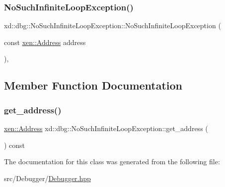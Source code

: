 \subsubsection{\texorpdfstring{No\+Such\+Infinite\+Loop\+Exception()}{NoSuchInfiniteLoopException()}}
{\footnotesize\ttfamily xd\+::dbg\+::\+No\+Such\+Infinite\+Loop\+Exception\+::\+No\+Such\+Infinite\+Loop\+Exception (\begin{DoxyParamCaption}\item[{const \mbox{\hyperlink{namespacexd_1_1xen_a94a8d6c9448e8330c771c100dba152c3}{xen\+::\+Address}}}]{address }\end{DoxyParamCaption})\hspace{0.3cm}{\ttfamily [inline]}, {\ttfamily [explicit]}}



\subsection{Member Function Documentation}
\mbox{\label{classxd_1_1dbg_1_1_no_such_infinite_loop_exception_a83b0d3f3fec215a59b8ecc9e70996505}} 
\subsubsection{\texorpdfstring{get\+\_\+address()}{get\_address()}}
{\footnotesize\ttfamily \mbox{\hyperlink{namespacexd_1_1xen_a94a8d6c9448e8330c771c100dba152c3}{xen\+::\+Address}} xd\+::dbg\+::\+No\+Such\+Infinite\+Loop\+Exception\+::get\+\_\+address (\begin{DoxyParamCaption}{ }\end{DoxyParamCaption}) const\hspace{0.3cm}{\ttfamily [inline]}}



The documentation for this class was generated from the following file\+:\begin{DoxyCompactItemize}
\item 
src/\+Debugger/\mbox{\hyperlink{_debugger_8hpp}{Debugger.\+hpp}}\end{DoxyCompactItemize}
